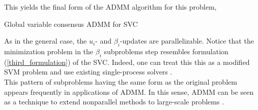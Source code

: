 \documentclass[11pt]{article}
\begin{document}
This yields the final form of the ADMM algorithm for this problem, \\

\begin{algorithm}[H]
    \caption{Global variable consensus ADMM for SVC}

    \SetAlgoNoLine

\end{algorithm}
\vspace{5pt}
As in the general case, the $u_i$- and $\beta_i$-updates are parallelizable. Notice 
that the minimization problem in the $\beta_i$ subproblems step resembles formulation (\ref{third_formulation}) of the SVC. Indeed, one can treat this this as a modified SVM problem and 
use existing single-process solvers \cite{boydistributed}. \\
This pattern of subproblems having the same form as the original problem appears frequently in 
applications of ADMM. In this sense, ADMM can be seen as a technique to extend nonparallel 
methods to large-scale problems \cite{boydistributed}.



\end{document}

